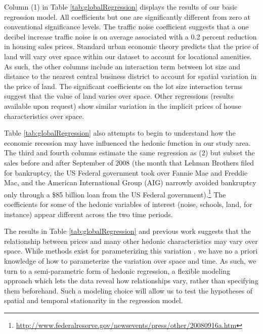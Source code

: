 \documentclass{article}\usepackage{graphicx, color}
\begin{document}
Column (1) in Table \ref{tab:globalRegression} displays the results of our basic regression model. All coefficients but one are significantly different from zero at conventional significance levels. The traffic noise coefficient suggests that a one decibel increase traffic noise is on average associated with a 0.2 percent reduction in housing sales prices. Standard urban economic theory \citep{Alonso1964, Mills1967, Muth1969} predicts that the price of land will vary over space within our dataset to account for locational amenities. As such, the other columns include an interaction term between lot size and distance to the nearest central business district to account for spatial variation in the price of land. The significant coefficients on the lot size interaction terms suggest that the value of land varies over space. Other regressions (results available upon request) show similar variation in the implicit prices of house characteristics over space.

Table \ref{tab:globalRegression} also attempts to begin to understand how the economic recession may have influenced the hedonic function in our study area. The third and fourth columns estimate the same regression as (2) but subset the sales before and after September of 2008 (the month that Lehman Brothers filed for bankruptcy, the US Federal government took over Fannie Mae and Freddie Mac, and the American International Group (AIG) narrowly avoided bankruptcy only through a \$85 billion loan from the US Federal government).\footnote{\url{http://www.federalreserve.gov/newsevents/press/other/20080916a.htm}} The coefficients for some of the hedonic variables of interest (noise, schools, land, for instance) appear different across the two time periods.

The results in Table \ref{tab:globalRegression} and previous work \citep[such as][]{Day2007, MarmolejoDuarteCarlos;GonzalezTamez2009} suggests that the relationship between prices and many other hedonic characteristics may vary over space. While methods exist for parameterizing this variation \citep[such as spatial expansion as suggested by][]{Casetti1972}, we have no a priori knowledge of how to parameterize the variation over space and time. As such, we turn to a semi-parametric form of hedonic regression, a flexible modeling approach which lets the data reveal how relationships vary, rather than specifying them beforehand. Such a modeling choice will allow us to test the hypotheses of spatial and temporal stationarity in the regression model.
\end{document}
